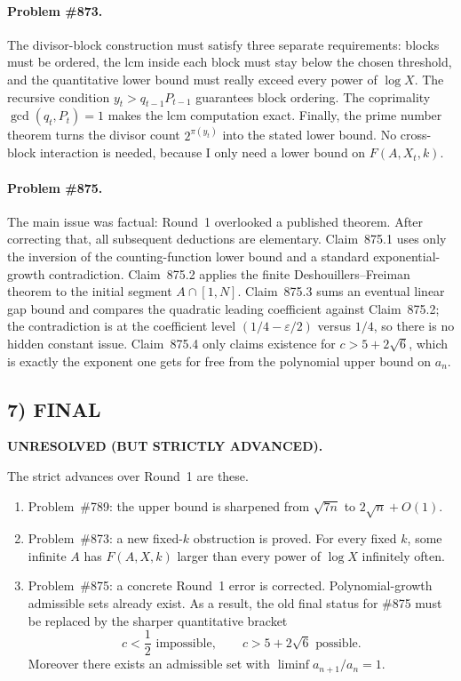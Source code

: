\paragraph{Problem \#873.}
The divisor-block construction must satisfy three separate requirements: blocks must be ordered, the lcm inside each block must stay below the chosen threshold, and the quantitative lower bound must really exceed every power of \(\log X\). The recursive condition \(y_t>q_{t-1}P_{t-1}\) guarantees block ordering. The coprimality \(\gcd(q_t,P_t)=1\) makes the lcm computation exact. Finally, the prime number theorem turns the divisor count \(2^{\pi(y_t)}\) into the stated lower bound. No cross-block interaction is needed, because I only need a lower bound on \(F(A,X_t,k)\).

\paragraph{Problem \#875.}
The main issue was factual: Round~1 overlooked a published theorem. After correcting that, all subsequent deductions are elementary. Claim~875.1 uses only the inversion of the counting-function lower bound and a standard exponential-growth contradiction. Claim~875.2 applies the finite Deshouillers--Freiman theorem to the initial segment \(A\cap[1,N]\). Claim~875.3 sums an eventual linear gap bound and compares the quadratic leading coefficient against Claim~875.2; the contradiction is at the coefficient level \((1/4-\varepsilon/2)\) versus \(1/4\), so there is no hidden constant issue. Claim~875.4 only claims existence for \(c>5+2\sqrt6\), which is exactly the exponent one gets for free from the polynomial upper bound on \(a_n\).

\subsection*{7) FINAL}

\textbf{UNRESOLVED (BUT STRICTLY ADVANCED).}

The strict advances over Round~1 are these.

\begin{enumerate}
\item Problem~\#789: the upper bound is sharpened from \(\sqrt{7n}\) to \(2\sqrt n+O(1)\).
\item Problem~\#873: a new fixed-\(k\) obstruction is proved. For every fixed \(k\), some infinite \(A\) has \(F(A,X,k)\) larger than every power of \(\log X\) infinitely often.
\item Problem~\#875: a concrete Round~1 error is corrected. Polynomial-growth admissible sets already exist. As a result, the old final status for \#875 must be replaced by the sharper quantitative bracket
\[
  c<\frac12 \text{ impossible},
  \qquad
  c>5+2\sqrt6 \text{ possible}.
\]
Moreover there exists an admissible set with \(\liminf a_{n+1}/a_n=1\).
\end{enumerate}

